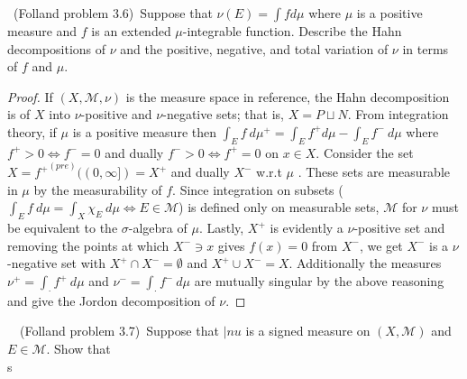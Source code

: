 \documentclass[11pt]{amsart}
\theoremstyle{definition}
\numberwithin{theorem}{section}
\numberwithin{definition}{section}
\numberwithin{equation}{section}
\def\scriptm{{\mathcal M}}
\begin{document}
\medskip {}\ (Folland problem 3.6)\ Suppose that $\nu(E) = \int f d \mu$ where $\mu$ is a positive measure and $f$ is an extended $\mu$-integrable function. Describe the Hahn decompositions of $\nu$ and the positive, negative, and total variation of $\nu$ in terms of $f$ and $\mu.$
\begin{proof}
	If $(X, \scriptm, \nu)$ is the measure space in reference, the Hahn decomposition is of $X$ into $\nu$-positive and $\nu$-negative sets; that is, $X = P \sqcup N$. From integration theory, if $\mu$ is a positive measure then $\int_E f\ d\mu^+ = \int_E f^+ d\mu - \int_E f^-\ d \mu$ where $f^+ > 0 \iff f^- = 0$ and dually $f^- > 0 \iff f^+ = 0$ on $x \in X$. Consider the set $X = {f^+}^{(pre)}((0, \infty]) = X^+$ and dually $X^-$ w.r.t $\mu$ . These sets are measurable in $\mu$ by the measurability of $f$. Since integration on subsets ($\int_E f\ d\mu = \int_X \chi_E\ d\mu \iff E\in\scriptm$) is defined only on measurable sets, $\scriptm$ for $\nu$ must be equivalent to the $\sigma$-algebra of $\mu$. Lastly, $X^+$ is evidently a $\nu$-positive set and removing the points at which $X^- \ni x$ gives $f(x) = 0$ from $X^-$, we get $X^-$ is a $\nu$-negative set with $X^+ \cap X^- = \emptyset$ and $X^+ \cup X^- = X$. Additionally the measures $\nu^+ = \int_\cdot f^+\ d\mu$ and $\nu^- = \int_\cdot f^-\ d\mu$ are mutually singular by the above reasoning and give the Jordon decomposition of $\nu$.
\end{proof}
\medskip {}\ \ (Folland problem 3.7)\ Suppose that $|nu$ is a signed measure on $(X, \scriptm)$ and $E \in \scriptm$. Show that\\s
\end{document}
